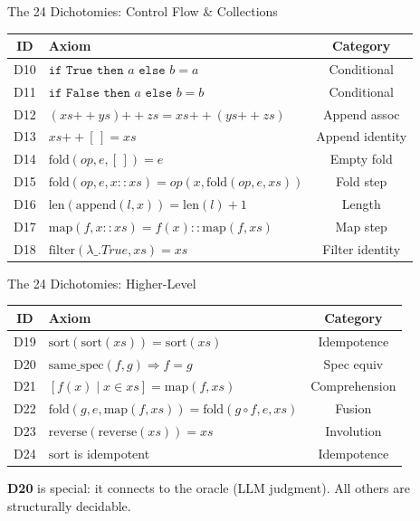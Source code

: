 \documentclass[aspectratio=169,11pt]{beamer}
\begin{document}
\begin{frame}{The 24 Dichotomies: Control Flow \& Collections}
\small
\begin{center}
\begin{tabular}{clc}
\toprule
\textbf{ID} & \textbf{Axiom} & \textbf{Category} \\
\midrule
D10 & $\texttt{if True then } a \texttt{ else } b = a$ & Conditional \\
D11 & $\texttt{if False then } a \texttt{ else } b = b$ & Conditional \\
D12 & $(xs \mathbin{+\!\!+} ys) \mathbin{+\!\!+} zs = xs \mathbin{+\!\!+} (ys \mathbin{+\!\!+} zs)$ & Append assoc \\
D13 & $xs \mathbin{+\!\!+} [\,] = xs$ & Append identity \\
D14 & $\mathrm{fold}(op, e, [\,]) = e$ & Empty fold \\
D15 & $\mathrm{fold}(op, e, x::xs) = op(x, \mathrm{fold}(op, e, xs))$ & Fold step \\
D16 & $\mathrm{len}(\mathrm{append}(l, x)) = \mathrm{len}(l) + 1$ & Length \\
D17 & $\mathrm{map}(f, x::xs) = f(x) :: \mathrm{map}(f, xs)$ & Map step \\
D18 & $\mathrm{filter}(\lambda\_.True, xs) = xs$ & Filter identity \\
\bottomrule
\end{tabular}
\end{center}
\end{frame}

\begin{frame}{The 24 Dichotomies: Higher-Level}
\small
\begin{center}
\begin{tabular}{clc}
\toprule
\textbf{ID} & \textbf{Axiom} & \textbf{Category} \\
\midrule
D19 & $\mathrm{sort}(\mathrm{sort}(xs)) = \mathrm{sort}(xs)$ & Idempotence \\
D20 & $\mathrm{same\_spec}(f,g) \Rightarrow f = g$ & Spec equiv \\
D21 & $[f(x) \mid x \in xs] = \mathrm{map}(f, xs)$ & Comprehension \\
D22 & $\mathrm{fold}(g, e, \mathrm{map}(f, xs)) = \mathrm{fold}(g \circ f, e, xs)$ & Fusion \\
D23 & $\mathrm{reverse}(\mathrm{reverse}(xs)) = xs$ & Involution \\
D24 & $\mathrm{sort}$ is idempotent & Idempotence \\
\bottomrule
\end{tabular}
\end{center}

\vspace{0.5em}
\textbf{D20} is special: it connects to the oracle (LLM judgment). All others are structurally decidable.
\end{frame}
\end{document}
